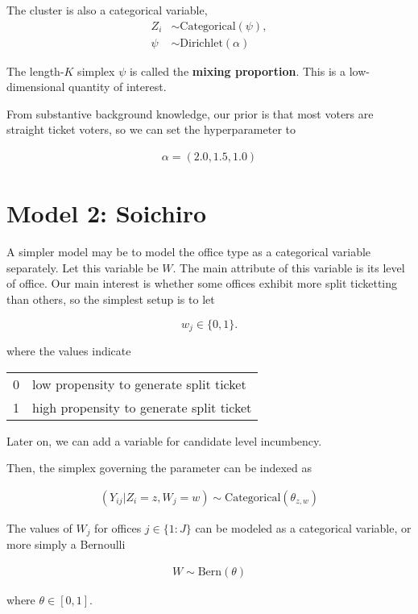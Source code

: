 \documentclass[12pt,letterpaper]{article}
\numberwithin{equation}{section}
\begin{document}
The cluster is also a categorical variable, \begin{align*}
Z_{i} &\sim \text{Categorical}(\psi),\\
\psi &\sim \text{Dirichlet}(\alpha)
\end{align*}

The length-\(K\) simplex \(\psi\) is called the \textbf{mixing
proportion}. This is a low-dimensional quantity of interest.

From substantive background knowledge, our prior is that most voters are
straight ticket voters, so we can set the hyperparameter to

\begin{align*}
\alpha = (2.0, 1.5, 1.0)
\end{align*}

\section{Model 2: Soichiro}

A simpler model may be to model the office type as a categorical
variable separately. Let this variable be \(W\). The main attribute of
this variable is its level of office. Our main interest is whether some
offices exhibit more split ticketting than others, so the simplest setup
is to let

\[w_{j} \in \{0, 1\}.\]

where the values indicate

\begin{table}[!h]
\centering
\begin{tabular}{ll}\toprule
0 & low propensity to generate split ticket\\
1 & high propensity to generate split ticket\\\bottomrule
\end{tabular}
\end{table}

Later on, we can add a variable for candidate level incumbency.

Then, the simplex governing the parameter can be indexed as

\begin{align*}
(Y_{ij} | Z_i = z, W_j = w) \sim \text{Categorical}(\theta_{z, w})
\end{align*}

The values of \(W_j\) for offices \(j \in \{1:J\}\) can be modeled as a
categorical variable, or more simply a Bernoulli

\begin{align*}
W \sim  \text{Bern}(\theta)
\end{align*}

where \(\theta \in [0, 1].\)
\end{document}
